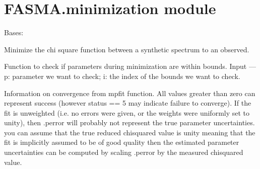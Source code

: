 \documentclass[letterpaper,10pt,english]{sphinxmanual}
\begin{document}
\section{FASMA.minimization module}
\label{\detokenize{index:module-FASMA.minimization}}\label{\detokenize{index:fasma-minimization-module}}

\begin{fulllineitems}
\label{\detokenize{index:FASMA.minimization.MinimizeSynth}}
Bases: 

Minimize the chi square function between a synthetic spectrum to an observed.

\begin{fulllineitems}
\label{\detokenize{index:FASMA.minimization.MinimizeSynth.bounds}}
Function to check if parameters during minimization are within bounds.
Input
—\textendash{}
p: parameter we want to check;
i: the index of the bounds we want to check.

\end{fulllineitems}


\begin{fulllineitems}
\label{\detokenize{index:FASMA.minimization.MinimizeSynth.convergence_info}}
Information on convergence from mpfit function. All values greater
than zero can represent success (however status == 5 may indicate failure
to converge).
If the fit is unweighted (i.e. no errors were given, or the weights
were uniformly set to unity), then .perror will probably not represent
the true parameter uncertainties.
 you can assume that the true reduced chi\sphinxhyphen{}squared value is unity \textendash{}
meaning that the fit is implicitly assumed to be of good quality \textendash{}
then the estimated parameter uncertainties can be computed by scaling
.perror by the measured chi\sphinxhyphen{}squared value.


\end{fulllineitems}
\end{fulllineitems}
\end{document}
